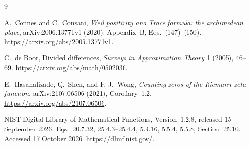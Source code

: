 \documentclass[11pt,a4paper]{article}
\theoremstyle{definition}
\theoremstyle{remark}
\numberwithin{equation}{section}
\begin{document}
\begin{thebibliography}{9}

A.~Connes and C.~Consani,
\emph{Weil positivity and Trace formula: the archimedean place},
arXiv:2006.13771v1 (2020), Appendix~B, Eqs.~(147)--(150).
\url{https://arxiv.org/abs/2006.13771v1}.

C.~de Boor, Divided differences,
\emph{Surveys in Approximation Theory} \textbf{1} (2005), 46--69.
\url{https://arxiv.org/abs/math/0502036}.

E.~Hasanalizade, Q.~Shen, and P.-J.~Wong,
\emph{Counting zeros of the Riemann zeta function},
arXiv:2107.06506 (2021), Corollary~1.2.
\url{https://arxiv.org/abs/2107.06506}.

NIST Digital Library of Mathematical Functions,
Version~1.2.8, released 15 September 2026.
Eqs.~20.7.32, 25.4.3--25.4.4, 5.9.16, 5.5.4, 5.5.8;
Section~25.10. Accessed 17 October 2026.
\url{https://dlmf.nist.gov/}.

\end{thebibliography}
\end{document}
